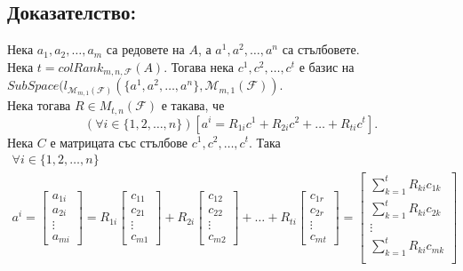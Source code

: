 \documentclass[a4paper,9pt]{extarticle}
\newcommand{\F}{\mathcal{F}}
\begin{document}
\subsection{Доказателство:}
Нека \(a_1, a_2, \dots, a_m\) са редовете на \(A\), а \(a^1, a^2, \dots, a^n\) са стълбовете. \\
Нека \(t = colRank_{m, n, \F}(A)\).
Тогава нека \(c^1, c^2, \dots, c^t\) е базис на \(SubSpace(l_{\mathcal{M}_{m, 1}(\F)}(\{a^1, a^2, \dots, a^n\}, \mathcal{M}_{m, 1}(\F))\). \\
Нека тогава \(R \in M_{t, n}(\F)\) е такава, че \[(\forall i \in \{1, 2, \dots, n\})[a^i = R_{1i} c^1 + R_{2i} c^2 + \dots + R_{ti} c^t].\]
Нека \(C\) е матрицата със стълбове \(c^1, c^2, \dots, c^t\).
Така
\begin{align*}
   \forall i \in \{1, 2, \dots, n\} \\
    a^i = \begin{bmatrix}
        a_{1i} \\
        a_{2i} \\
        \vdots \\
        a_{mi}
    \end{bmatrix} =
    R_{1i} \begin{bmatrix}
        c_{11} \\
        c_{21} \\
        \vdots \\
        c_{m1}
    \end{bmatrix}
    + R_{2i} \begin{bmatrix}
        c_{12} \\
        c_{22} \\
        \vdots \\
        c_{m2}
    \end{bmatrix}
    + \dots +
    R_{ti} \begin{bmatrix}
        c_{1r} \\
        c_{2r} \\
        \vdots \\
        c_{mt}
    \end{bmatrix} =
    \begin{bmatrix}
        \displaystyle\sum_{k = 1}^t R_{ki} c_{1k} \\
         \displaystyle\sum_{k = 1}^t R_{ki} c_{2k} \\
        \vdots \\
         \displaystyle\sum_{k = 1}^t R_{ki} c_{mk} \\
    \end{bmatrix}
\end{align*}
\end{document}
